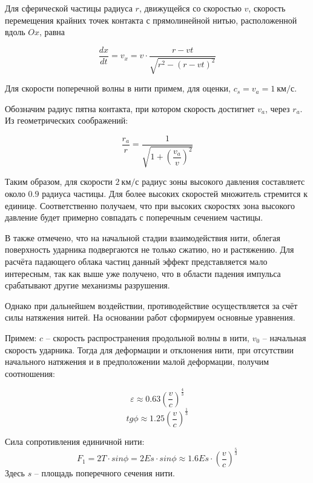 Для сферической частицы радиуса $r$, движущейся со скоростью $v$, скорость перемещения крайних точек контакта с
прямолинейной нитью, расположенной вдоль $Ox$, равна

\begin{equation}
    \frac{dx}{dt} = v_x = v \cdot \frac{r - v t}{\sqrt{r^2 - (r - v t)^2}}
\end{equation}

Для скорости поперечной волны в нити примем, для оценки, $c_s = v_a = 1~км/с$.

Обозначим радиус пятна контакта, при котором скорость достигнет $v_a$, через $r_a$.
Из геометрических соображений:

\begin{equation}
    \dfrac{r_a}{r} = \dfrac{1}{\sqrt{1 + (\dfrac{v_a}{v})^2}}
\end{equation}

Таким образом, для скорости $2~км/с$ радиус зоны высокого давления составляетс около $0.9$ радиуса частицы.
Для более высоких скоростей множитель стремится к единице.
Соответственно получаем, что при высоких скоростях зона высокого давление будет примерно совпадать с поперечным сечением частицы.

В\cite{kobylkin2014} также отмечено, что на начальной стадии взаимодействия нити, облегая поверхность ударника подвергаются
не только сжатию, но и растяжению.
Для расчёта падающего облака частиц данный эффект представляется мало интересным, так как выше уже получено, что в области
падения импульса срабатывают другие механизмы разрушения.

Однако при дальнейшем воздействии, противодействие осуществляется за счёт силы натяжения нитей.
На основании работ\cite{rakhmatulin} сформируем основные уравнения.

Примем: $c$ -- скорость распространения продольной волны в нити, $v_0$ -- начальная скорость ударника.
Тогда для деформации и отклонения нити, при отсутствии начального натяжения и в предположении малой деформации,
получим соотношения:

\begin{equation}
    \varepsilon \approx 0.63 \left( \dfrac{v}{c} \right)^{\frac{4}{3}}
\end{equation}
\begin{equation}
    tg \phi \approx 1.25 \left( \dfrac{v}{c} \right)^{\frac{1}{3}}
\end{equation}

Сила сопротивления единичной нити:
\begin{equation}
    F_1 = 2 T \cdot sin \phi = 2 E s \cdot sin \phi \approx 1.6 E s \cdot \left( \dfrac{v}{c} \right)^{\frac{5}{3}}
\end{equation}
Здесь $s$ -- площадь поперечного сечения нити.

